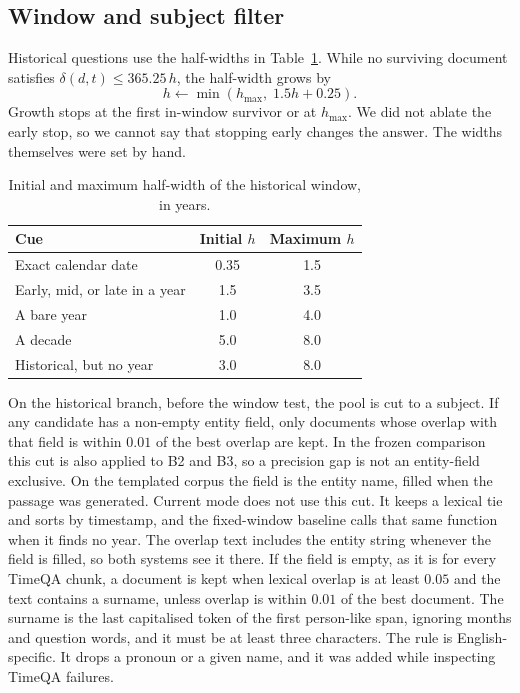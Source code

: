 \documentclass[11pt]{article}
\begin{document}
\subsection{Window and subject filter}

Historical questions use the half-widths in Table~\ref{tab:windows}.
While no surviving document satisfies $\delta(d,t)\le 365.25\,h$, the half-width grows by
\begin{equation}
h \leftarrow \min(h_{\max},\; 1.5h + 0.25).
\label{eq:grow}
\end{equation}
Growth stops at the first in-window survivor or at $h_{\max}$.
We did not ablate the early stop, so we cannot say that stopping early changes the answer.
The widths themselves were set by hand.

\begin{table}[t]
\centering
\caption{Initial and maximum half-width of the historical window, in years.}
\label{tab:windows}
\begin{tabular}{lcc}
\toprule
Cue & Initial $h$ & Maximum $h$ \\
\midrule
Exact calendar date & 0.35 & 1.5 \\
Early, mid, or late in a year & 1.5 & 3.5 \\
A bare year & 1.0 & 4.0 \\
A decade & 5.0 & 8.0 \\
Historical, but no year & 3.0 & 8.0 \\
\bottomrule
\end{tabular}
\end{table}

On the historical branch, before the window test, the pool is cut to a subject.
If any candidate has a non-empty entity field, only documents whose overlap with that field is within $0.01$ of the best overlap are kept.
In the frozen comparison this cut is also applied to B2 and B3, so a precision gap is not an entity-field exclusive.
On the templated corpus the field is the entity name, filled when the passage was generated.
Current mode does not use this cut.
It keeps a lexical tie and sorts by timestamp, and the fixed-window baseline calls that same function when it finds no year.
The overlap text includes the entity string whenever the field is filled, so both systems see it there.
If the field is empty, as it is for every TimeQA chunk, a document is kept when lexical overlap is at least $0.05$ and the text contains a surname, unless overlap is within $0.01$ of the best document.
The surname is the last capitalised token of the first person-like span, ignoring months and question words, and it must be at least three characters.
The rule is English-specific.
It drops a pronoun or a given name, and it was added while inspecting TimeQA failures.
\end{document}
